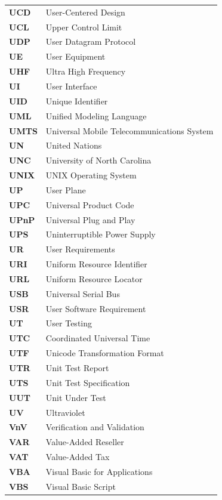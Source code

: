 \begin{longtable}{p{3cm}p{11cm}}
\textbf{UCD} & User-Centered Design \\
\textbf{UCL} & Upper Control Limit \\
\textbf{UDP} & User Datagram Protocol \\
\textbf{UE} & User Equipment \\
\textbf{UHF} & Ultra High Frequency \\
\textbf{UI} & User Interface \\
\textbf{UID} & Unique Identifier \\
\textbf{UML} & Unified Modeling Language \\
\textbf{UMTS} & Universal Mobile Telecommunications System \\
\textbf{UN} & United Nations \\
\textbf{UNC} & University of North Carolina \\
\textbf{UNIX} & UNIX Operating System \\
\textbf{UP} & User Plane \\
\textbf{UPC} & Universal Product Code \\
\textbf{UPnP} & Universal Plug and Play \\
\textbf{UPS} & Uninterruptible Power Supply \\
\textbf{UR} & User Requirements \\
\textbf{URI} & Uniform Resource Identifier \\
\textbf{URL} & Uniform Resource Locator \\
\textbf{USB} & Universal Serial Bus \\
\textbf{USR} & User Software Requirement \\
\textbf{UT} & User Testing \\
\textbf{UTC} & Coordinated Universal Time \\
\textbf{UTF} & Unicode Transformation Format \\
\textbf{UTR} & Unit Test Report \\
\textbf{UTS} & Unit Test Specification \\
\textbf{UUT} & Unit Under Test \\
\textbf{UV} & Ultraviolet \\
\textbf{VnV} & Verification and Validation \\
\textbf{VAR} & Value-Added Reseller \\
\textbf{VAT} & Value-Added Tax \\
\textbf{VBA} & Visual Basic for Applications \\
\textbf{VBS} & Visual Basic Script \\

\end{longtable}
